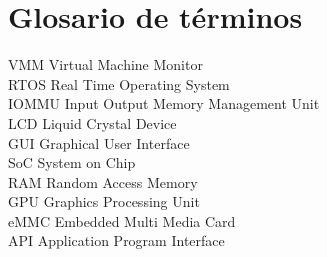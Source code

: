 \section{Glosario de términos}

VMM     Virtual Machine Monitor\\
RTOS    Real Time Operating System\\
IOMMU   Input Output Memory Management Unit\\
LCD     Liquid Crystal Device\\
GUI     Graphical User Interface\\
SoC     System on Chip\\
RAM     Random Access Memory\\
GPU     Graphics Processing Unit\\
eMMC    Embedded Multi Media Card\\
API     Application Program Interface\\
